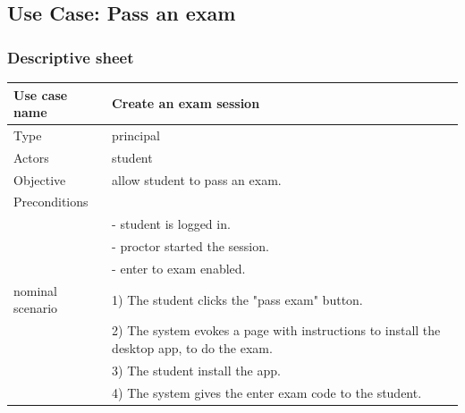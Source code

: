 \documentclass[]{uc2pfecaneva}
\begin{document}
    \begin{table}[h]
        \raggedright\subsection{Use Case: Pass an exam}
        \subsubsection{Descriptive sheet}
        \centering
        \begin{tabularx}{\textwidth}{|l|X|}
            \hline
            Use case name         & Create an exam session                                                                            \\ \hline
            Type                  & principal                                                                                         \\ \hline
            Actors                & student                                                                                           \\ \hline
            Objective             & allow student to pass an exam.                                                                    \\ \hline
            Preconditions         &                                                                                                   \\
            & - student is logged in.                                                                           \\
            & - proctor started the session.                                                                    \\
            & - enter to exam enabled.                                                                          \\ \hline
            nominal scenario
            & 1) The student clicks the "pass exam" button.                                                     \\
            & 2) The system evokes a page with instructions to install the desktop app, to do the exam.         \\
            & 3) The student install the app.                                                                   \\
            & 4) The system gives the enter exam code to the student.                                           \\

\end{tabularx}
\end{table}
\end{document}
